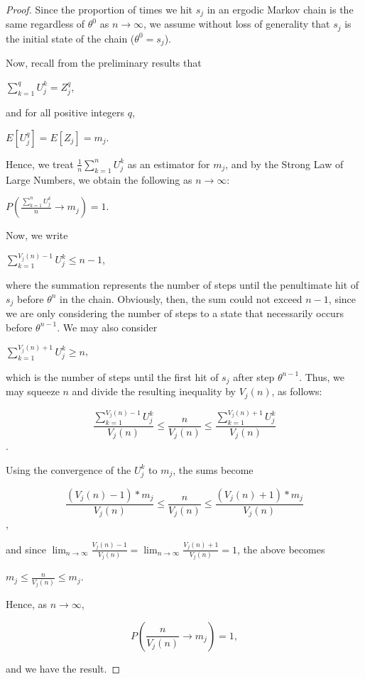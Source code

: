 \documentclass[12pt,twoside]{reedthesis}
\begin{document}
		\begin{proof}
		Since the proportion of times we hit $s_j$ in an ergodic Markov chain is the same regardless of $\theta^0$ as $n \rightarrow \infty$, we assume without loss of generality that $s_j$ is the initial state of the chain ($\theta^0 = s_j$).
		
		Now, recall from the preliminary results that 
		\begin{center}
		 $\displaystyle\sum_{k=1}^{q}U_j^k 
		 = Z_j^q$,
		 \end{center}
		 and for all positive integers $q$, 
		 \begin{center}
			 $E[U_{j}^q] = E[Z_j] = m_j$.
		 \end{center}
		Hence, we treat $\frac{1}{n}\sum_{k=1}^{n}U_j^k$ as an estimator for $m_j$, 
		and by the Strong Law of Large Numbers, we obtain the following as $n \rightarrow \infty$: 
		\begin{center}
		$
		P\left(\displaystyle\frac{\sum_{k=1}^{n}U_j^k}{n} \rightarrow m_j \right) = 1.
		$
		\end{center}
		Now, we write
		\begin{center}
		$\displaystyle\sum_{k=1}^{V_j(n) - 1}U_j^k \leq n -1$, 
		\end{center}
		where the summation represents the number of steps until the penultimate hit of $s_j$ before $\theta^n$ in the chain.
		Obviously, then, the sum could not exceed $n -1$, since we are only considering the number of steps to a state that necessarily occurs before $\theta^{n-1}$. We may also consider 
		\begin{center}
		$\displaystyle\sum_{k=1}^{V_j(n) + 1}U_j^k \geq n$,
		\end{center}
		which is the number of steps until the first hit of $s_j$ after step $\theta^{n-1}$. 
		Thus, we may squeeze $n$ and divide the resulting inequality by $V_j(n)$, as follows:
		\begin{center}
		$$\displaystyle\frac{\displaystyle\sum_{k=1}^{V_j(n)-1}U_j^k}{V_j(n)} \leq 
		\frac{n}{V_j(n)} \leq 
		\frac{\displaystyle\sum_{k=1}^{V_j(n) + 1}U_j^k}{V_j(n)}$$.
		\end{center}
		Using the convergence of the $U_j^k$ to $m_j$, the sums become
		\begin{center}
		$$\displaystyle\frac{(V_j(n) - 1) * m_j}{V_j(n)} \leq 
		\frac{n}{V_j(n)} \leq 
		\frac{(V_j(n) + 1) * m_j}{V_j(n)}$$,
		\end{center}		
		and since $\displaystyle\lim_{n \rightarrow \infty}\frac{V_j(n) - 1}{V_j(n)} = \displaystyle\lim_{n \rightarrow \infty}\frac{V_j(n) + 1}{V_j(n)} = 1$, the above becomes
		 \begin{center}
		 	$ m_j \leq \displaystyle\frac{n}{V_j(n)} \leq m_j$.
		 \end{center}
		 Hence, as $n \rightarrow \infty$,
		 \begin{center}
		 $$
		 P\left( \displaystyle\frac{n}{V_j(n)} \longrightarrow {m_j} \right) = 1,
		 $$
		 \end{center}
		 and we have the result.
		 \end{proof}
\end{document}
